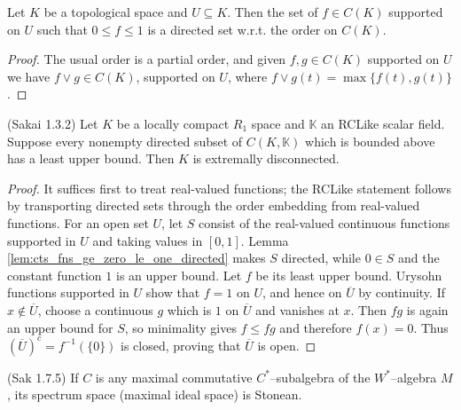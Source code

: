 \begin{lemma}
    \label{lem:cts_fns_ge_zero_le_one_directed}
    \leanok
    Let $K$ be a topological space and $U\subseteq K$. Then the set of $f\in C(K)$ supported on $U$ such that
    $0 \le f \le 1$ is a directed set w.r.t. the order on $C(K)$.
\end{lemma}

\begin{proof}
    \leanok
    The usual order is a partial order, and given $f,g\in C(K)$ supported on $U$ we have $f\vee g \in C(K)$, 
    supported on $U$, where $f\vee g(t)=\max\{f(t),g(t)\}$.
\end{proof}

\begin{proposition}
    \label{prop:stonean_of_cts_fcns_incr_cond_complete_Sak_1_3_2} (Sakai 1.3.2)
    \leanok
    Let $K$ be a locally compact $R_1$ space and $\mathbb{K}$ an RCLike scalar field. Suppose every
    nonempty directed subset of $C(K,\mathbb{K})$ which is bounded above has a least upper bound.
    Then $K$ is extremally disconnected.
\end{proposition}

\begin{proof}
    \leanok
    It suffices first to treat real-valued functions; the RCLike statement follows by transporting
    directed sets through the order embedding from real-valued functions. For an open set $U$, let
    $S$ consist of the real-valued continuous functions supported in $U$ and taking values in
    $[0,1]$. Lemma \ref{lem:cts_fns_ge_zero_le_one_directed} makes $S$ directed, while $0\in S$
    and the constant function $1$ is an upper bound. Let $f$ be its least upper bound. Urysohn
    functions supported in $U$ show that $f=1$ on $U$, and hence on $\overline U$ by continuity.
    If $x\notin\overline U$, choose a continuous $g$ which is $1$ on $\overline U$ and vanishes at
    $x$. Then $fg$ is again an upper bound for $S$, so minimality gives $f\le fg$ and therefore
    $f(x)=0$. Thus $(\overline U)^c=f^{-1}(\{0\})$ is closed, proving that $\overline U$ is open.
\end{proof}

\begin{lemma}
  \label{lem:spec_masa_wstar_stonean_Sak_1_7_5} (Sak 1.7.5)
  \leanok
  If $C$ is any maximal commutative $C^*$--subalgebra of the $W^{*}$--algebra $M$, its
  spectrum space (maximal ideal space) is Stonean.
\end{lemma}

